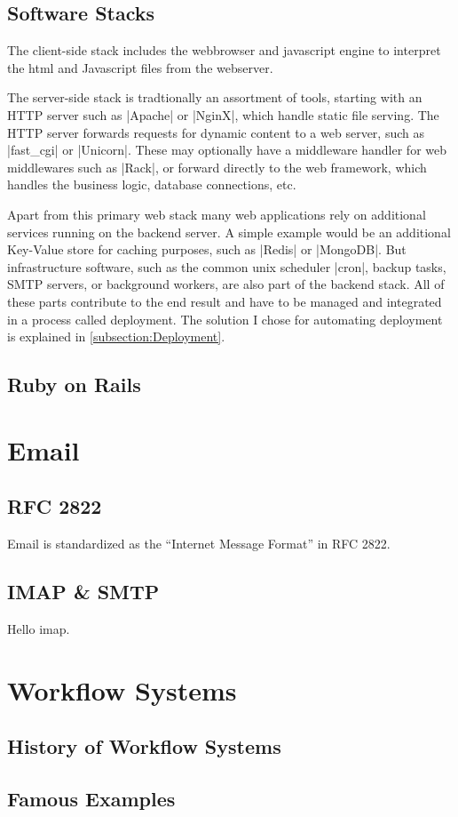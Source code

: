 \subsection{Software Stacks}

The client-side stack includes the webbrowser and javascript engine to interpret the \gls{html} and Javascript files from the webserver.

The server-side stack is tradtionally an assortment of tools, starting with an HTTP server such as |Apache| or |NginX|, which handle static file serving. The HTTP server forwards requests for dynamic content to a web server, such as |fast_cgi| or |Unicorn|. These may optionally have a middleware handler for web middlewares such as |Rack|, or forward directly to the web framework, which handles the business logic, database connections, etc.

Apart from this primary web stack many web applications rely on additional services running on the backend server. A simple example would be an additional Key-Value store for caching purposes, such as |Redis| or |MongoDB|. But infrastructure software, such as the common unix scheduler |cron|, backup tasks, SMTP servers, or background workers, are also part of the backend stack. All of these parts contribute to the end result and have to be managed and integrated in a process called deployment. The solution I chose for automating deployment is explained in \autoref{subsection:Deployment}.

\subsection{Ruby on Rails}





\section{Email}


\subsection{RFC 2822}

Email is standardized as the ``Internet Message Format'' in RFC 2822\cite{email}.

\subsection{IMAP \& SMTP}

Hello \gls{imap}.


\section{Workflow Systems}


\subsection{History of Workflow Systems}


\subsection{Famous Examples}